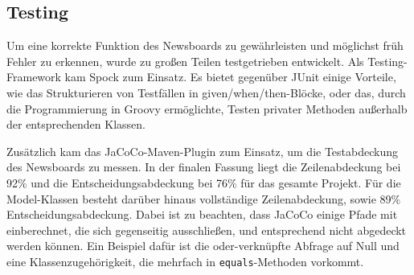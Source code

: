 \subsection{Testing}
Um eine korrekte Funktion des Newsboards zu gewährleisten und möglichst früh
Fehler zu erkennen, wurde zu großen Teilen testgetrieben entwickelt.
Als Testing-Framework kam Spock zum Einsatz. Es bietet gegenüber JUnit einige Vorteile,
wie das Strukturieren von Testfällen in given/when/then-Blöcke,
oder das, durch die Programmierung in Groovy ermöglichte, Testen privater Methoden
außerhalb der entsprechenden Klassen.

Zusätzlich kam das JaCoCo-Maven-Plugin zum Einsatz, um die Testabdeckung des Newsboards
zu messen. In der finalen Fassung liegt die Zeilenabdeckung bei 92\%
und die Entscheidungsabdeckung bei 76\% für das gesamte Projekt.
Für die Model-Klassen besteht darüber hinaus vollständige Zeilenabdeckung,
sowie 89\% Entscheidungsabdeckung. Dabei ist zu beachten, dass JaCoCo einige Pfade
mit einberechnet, die sich gegenseitig ausschließen, und entsprechend
nicht abgedeckt werden können. Ein Beispiel dafür ist die oder-verknüpfte Abfrage
auf Null und eine Klassenzugehörigkeit, die mehrfach in \texttt{equals}-Methoden vorkommt.
